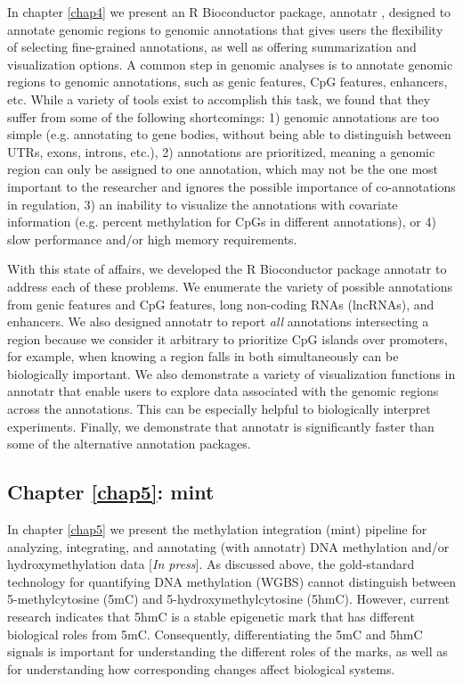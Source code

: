 In chapter \ref{chap4} we present an R Bioconductor package, annotatr \cite{Cavalcante:2017gc}, designed to annotate genomic regions to genomic annotations that gives users the flexibility of selecting fine-grained annotations, as well as offering summarization and visualization options. A common step in genomic analyses is to annotate genomic regions to genomic annotations, such as genic features, CpG features, enhancers, etc. While a variety of tools exist to accomplish this task, we found that they suffer from some of the following shortcomings: 1) genomic annotations are too simple (e.g. annotating to gene bodies, without being able to distinguish between UTRs, exons, introns, etc.), 2) annotations are prioritized, meaning a genomic region can only be assigned to one annotation, which may not be the one most important to the researcher and ignores the possible importance of co-annotations in regulation, 3) an inability to visualize the annotations with covariate information (e.g. percent methylation for CpGs in different annotations), or 4) slow performance and/or high memory requirements.

With this state of affairs, we developed the R Bioconductor package annotatr to address each of these problems. We enumerate the variety of possible annotations from genic features and CpG features, long non-coding RNAs (lncRNAs), and enhancers. We also designed annotatr to report \emph{all} annotations intersecting a region because we consider it arbitrary to prioritize CpG islands over promoters, for example, when knowing a region falls in both simultaneously can be biologically important. We also demonstrate a variety of visualization functions in annotatr that enable users to explore data associated with the genomic regions across the annotations. This can be especially helpful to biologically interpret experiments. Finally, we demonstrate that annotatr is significantly faster than some of the alternative annotation packages.

\subsection{Chapter \ref{chap5}: mint}
\label{intro:mint}

In chapter \ref{chap5} we present the methylation integration (mint) pipeline for analyzing, integrating, and annotating (with annotatr) DNA methylation and/or hydroxymethylation data [\emph{In press}]. As discussed above, the gold-standard technology for quantifying DNA methylation (WGBS) cannot distinguish between 5-methylcytosine (5mC) and 5-hydroxymethylcytosine (5hmC). However, current research indicates that 5hmC is a stable epigenetic mark that has different biological roles from 5mC. Consequently, differentiating the 5mC and 5hmC signals is important for understanding the different roles of the marks, as well as for understanding how corresponding changes  affect biological systems.


